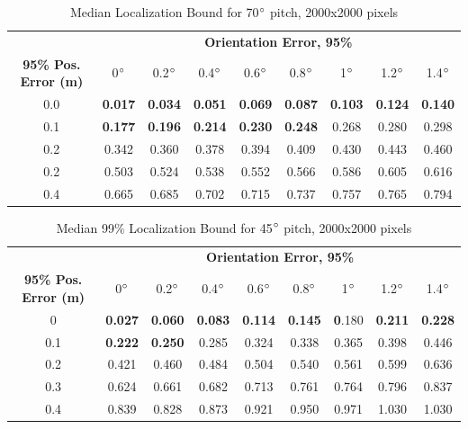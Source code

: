 \documentclass[a4paper,12pt,twoside,openright]{report}
\begin{document}
\begin{table}[htb]
\centering
\caption{Median Localization Bound for 70$\degree$ pitch, 2000x2000 pixels}
\label{tab:camera:70deg}

\begin{tabular}{ccccccccc}
\toprule
& \multicolumn{8}{c}{\textbf{Orientation Error, 95\%}} \\
\cmidrule(ll){2-9}
\multicolumn{1}{N}{\textbf{95\% Pos. Error (m)}} & 0$\degree$& 0.2$\degree$& 0.4$\degree$ & 0.6$\degree$ & 0.8$\degree$ & 1$\degree$ & 1.2$\degree$ & 1.4$\degree$\\
\cmidrule(lr){1-1}
\cmidrule(ll){2-9}
0.0 & \textbf{0.017} & \textbf{0.034} & \textbf{0.051} & \textbf{0.069} & \textbf{0.087} & \textbf{0.103} & \textbf{0.124} & \textbf{0.140} \\
0.1 & \textbf{0.177} & \textbf{0.196} & \textbf{0.214} & \textbf{0.230} & \textbf{0.248} & 0.268 & 0.280 & 0.298 \\
0.2 & 0.342 & 0.360 & 0.378 & 0.394 & 0.409 & 0.430 & 0.443 & 0.460  \\
0.2 & 0.503 & 0.524 & 0.538 & 0.552 & 0.566 & 0.586 & 0.605 & 0.616  \\
0.4 & 0.665 & 0.685 & 0.702 & 0.715 & 0.737 & 0.757 & 0.765 & 0.794  \\
\end{tabular} 
\end{table}


\begin{table}[htb]
\centering
\caption{Median 99\% Localization Bound for 45$\degree$ pitch, 2000x2000 pixels}
\label{tab:camera:45deg}

\begin{tabular}{ccccccccc}
\toprule
& \multicolumn{8}{c}{\textbf{Orientation Error, 95\%}} \\
\cmidrule(ll){2-9}
\multicolumn{1}{N}{\textbf{95\% Pos. Error (m)}} & 0$\degree$& 0.2$\degree$& 0.4$\degree$ & 0.6$\degree$ & 0.8$\degree$ & 1$\degree$ & 1.2$\degree$ & 1.4$\degree$\\
\cmidrule(lr){1-1}
\cmidrule(ll){2-9}
0 & \textbf{0.027} & \textbf{0.060} & \textbf{0.083} & \textbf{0.114} & \textbf{0.145} &\textbf{ 0}.180 & \textbf{0.211} & \textbf{0.228} \\
0.1 & \textbf{0.222} & \textbf{0.250} & 0.285 & 0.324 & 0.338 & 0.365 & 0.398 & 0.446 \\
0.2 & 0.421 & 0.460 & 0.484 & 0.504 & 0.540 & 0.561 & 0.599 & 0.636 \\
0.3 & 0.624 & 0.661 & 0.682 & 0.713 & 0.761 & 0.764 & 0.796 & 0.837 \\
0.4 & 0.839 & 0.828 & 0.873 & 0.921 & 0.950 & 0.971 & 1.030 & 1.030 \\
\end{tabular} 
\end{table}
\end{document}
